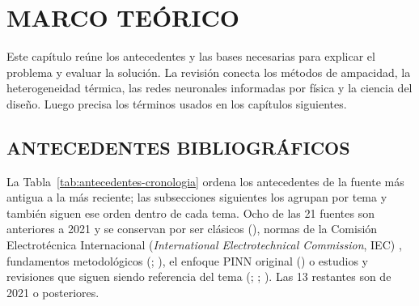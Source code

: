 ﻿\chapter{MARCO TEÓRICO}
\label{ch:marco-teorico}
\thispagestyle{empty}

Este capítulo reúne los antecedentes y las bases necesarias para explicar el problema y evaluar la solución. La revisión conecta los métodos de ampacidad, la heterogeneidad térmica, las redes neuronales informadas por física y la ciencia del diseño. Luego precisa los términos usados en los capítulos siguientes.

\section{ANTECEDENTES BIBLIOGRÁFICOS}
\label{sec:antecedentes}

La Tabla~\ref{tab:antecedentes-cronologia} ordena los antecedentes de la fuente más antigua a la más reciente; las subsecciones siguientes los agrupan por tema y también siguen ese orden dentro de cada tema. Ocho de las 21 fuentes son anteriores a 2021 y se conservan por ser clásicos (\textcite{neher1957}), normas de la Comisión Electrotécnica Internacional (\textit{International Electrotechnical Commission}, IEC) \parencite{iec60853}, fundamentos metodológicos (\textcite{peffers2007}; \textcite{gregor2013}), el enfoque PINN original (\textcite{raissi2017}) o estudios y revisiones que siguen siendo referencia del tema (\textcite{aras2005}; \textcite{oclon2015}; \textcite{enescu2020}). Las 13 restantes son de 2021 o posteriores.

